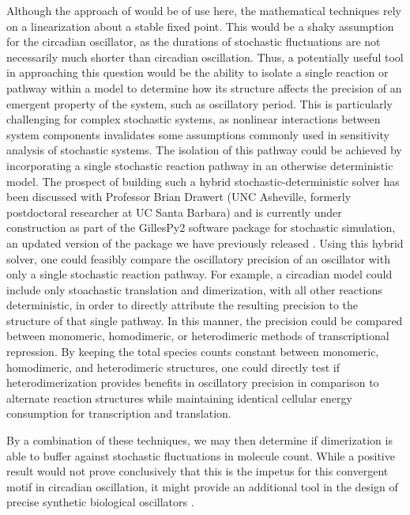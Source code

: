 Although the approach of \cite{Hancock2017} would be of use here, the mathematical techniques rely on a linearization about a stable fixed point.
This would be a shaky assumption for the circadian oscillator, as the durations of stochastic fluctuations are not necessarily much shorter than circadian oscillation.
Thus, a potentially useful tool in approaching this question would be the ability to isolate a single reaction or pathway within a model to determine how its structure affects the precision of an emergent property of the system, such as oscillatory period.
This is particularly challenging for complex stochastic systems, as nonlinear interactions between system components invalidates some assumptions commonly used in sensitivity analysis of stochastic systems.
The isolation of this pathway could be achieved by incorporating a single stochastic reaction pathway in an otherwise deterministic model.
The prospect of building such a hybrid stochastic-deterministic solver has been discussed with Professor Brian Drawert (UNC Asheville, formerly postdoctoral researcher at UC Santa Barbara) and is currently under construction as part of the GillesPy2 software package for stochastic simulation, an updated version of the package we have previously released \cite{Abel2017}.
Using this hybrid solver, one could feasibly compare the oscillatory precision of an oscillator with only a single stochastic reaction pathway.
For example, a circadian model could include only stoachastic translation and dimerization, with all other reactions deterministic, in order to directly attribute the resulting precision to the structure of that single pathway.
In this manner, the precision could be compared between monomeric, homodimeric, or heterodimeric methods of transcriptional repression.
By keeping the total species counts constant between monomeric, homodimeric, and heterodimeric structures, one could directly test if heterodimerization provides benefits in oscillatory precision in comparison to alternate reaction structures while maintaining identical cellular energy consumption for transcription and translation.

By a combination of these techniques, we may then determine if dimerization is able to buffer against stochastic fluctuations in molecule count. 
While a positive result would not prove conclusively that this is the impetus for this convergent motif in circadian oscillation, it might provide an additional tool in the design of precise synthetic biological oscillators \cite{Potvin2016}.




